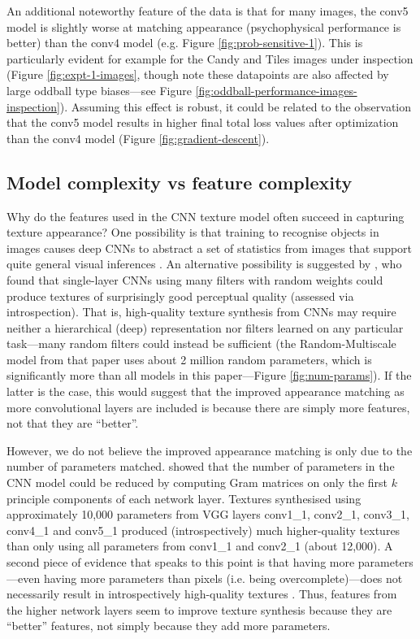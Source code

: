 \documentclass[article, 11pt,a4paper,natbib]{apa6}\usepackage[]{graphicx}\usepackage[]{color}
\begin{document}
An additional noteworthy feature of the data is that for many images, the conv5 model is slightly worse at matching appearance (psychophysical performance is better) than the conv4 model (e.g. Figure \ref{fig:prob-sensitive-1}).
This is particularly evident for example for the Candy and Tiles images under inspection (Figure \ref{fig:expt-1-images}, though note these datapoints are also affected by large oddball type biases---see Figure \ref{fig:oddball-performance-images-inspection}).
Assuming this effect is robust, it could be related to the observation that the conv5 model results in higher final total loss values after optimization than the conv4 model (Figure \ref{fig:gradient-descent}). 

\subsection{Model complexity vs feature complexity}

Why do the features used in the CNN texture model often succeed in capturing texture appearance?
One possibility is that training to recognise objects in images causes deep CNNs to abstract a set of statistics from images that support quite general visual inferences \citep[transfer learning;][]{donahue_decaf_2013}.
An alternative possibility is suggested by \citet{ustyuzhaninov_texture_2016}, who found that single-layer CNNs using many filters with random weights could produce textures of surprisingly good perceptual quality (assessed via introspection).
That is, high-quality texture synthesis from CNNs may require neither a hierarchical (deep) representation nor filters learned on any particular task---many random filters could instead be sufficient (the Random-Multiscale model from that paper uses about 2 million random parameters, which is significantly more than all models in this paper---Figure \ref{fig:num-params}). 
If the latter is the case, this would suggest that the improved appearance matching as more convolutional layers are included is because there are simply more features, not that they are ``better''. 

However, we do not believe the improved appearance matching is only due to the number of parameters matched.
\citet{gatys_texture_2015-1} showed that the number of parameters in the CNN model could be reduced by computing Gram matrices on only the first $k$ principle components of each network layer.
Textures synthesised using approximately 10,000 parameters from VGG layers conv1\_1, conv2\_1, conv3\_1, conv4\_1 and conv5\_1 produced (introspectively) much higher-quality textures than only using all parameters from conv1\_1 and conv2\_1 (about 12,000). 
A second piece of evidence that speaks to this point is that having more parameters---even having more parameters than pixels (i.e. being overcomplete)---does not necessarily result in introspectively high-quality textures \citep{ustyuzhaninov_texture_2016}.
Thus, features from the higher network layers seem to improve texture synthesis because they are ``better'' features, not simply because they add more parameters.
\end{document}
